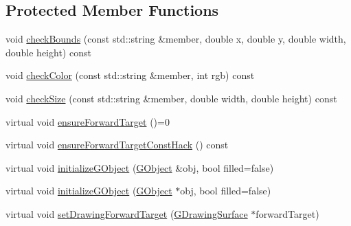\subsection*{Protected Member Functions}
\begin{DoxyCompactItemize}
\item 
void \mbox{\hyperlink{classGDrawingSurface_a3a690bcb2d62250c9e4722ad7c1b9ab6}{check\+Bounds}} (const std\+::string \&member, double x, double y, double width, double height) const
\item 
void \mbox{\hyperlink{classGDrawingSurface_a9841b5dc607ca41a14819d80e1d8a09c}{check\+Color}} (const std\+::string \&member, int rgb) const
\item 
void \mbox{\hyperlink{classGDrawingSurface_a70a6546707ae708573396616bd0f5320}{check\+Size}} (const std\+::string \&member, double width, double height) const
\item 
virtual void \mbox{\hyperlink{classGForwardDrawingSurface_aeb0d09dcde7e811a273d032b9d3eddb4}{ensure\+Forward\+Target}} ()=0
\item 
virtual void \mbox{\hyperlink{classGForwardDrawingSurface_a1b7188344977b67f01c452a6ba490992}{ensure\+Forward\+Target\+Const\+Hack}} () const
\item 
virtual void \mbox{\hyperlink{classGDrawingSurface_a814498efebc5586645159cd22990cf61}{initialize\+G\+Object}} (\mbox{\hyperlink{classGObject}{G\+Object}} \&obj, bool filled=false)
\item 
virtual void \mbox{\hyperlink{classGDrawingSurface_a43e6bc951980da061ddc40407daee227}{initialize\+G\+Object}} (\mbox{\hyperlink{classGObject}{G\+Object}} $\ast$obj, bool filled=false)
\item 
virtual void \mbox{\hyperlink{classGDrawingSurface_a0584e02dc9d80b3544d68684e79af1d8}{set\+Drawing\+Forward\+Target}} (\mbox{\hyperlink{classGDrawingSurface}{G\+Drawing\+Surface}} $\ast$forward\+Target)
\end{DoxyCompactItemize}
